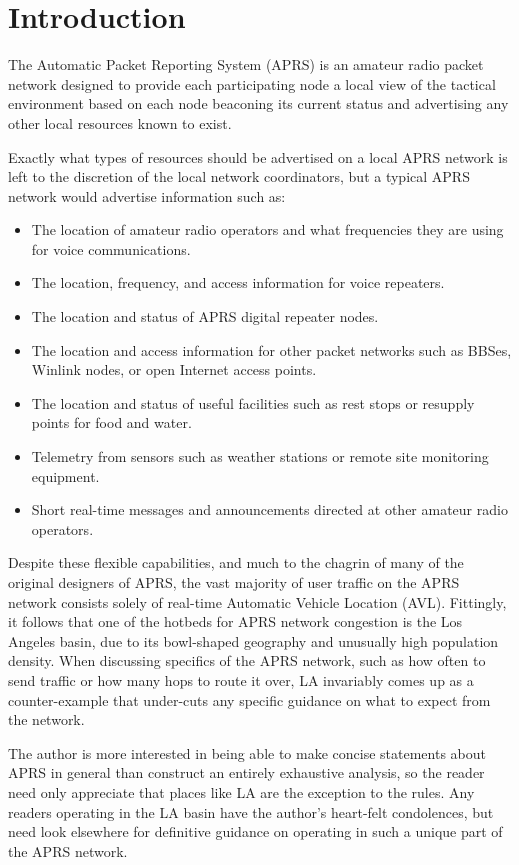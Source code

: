 

\chapter{Introduction}

The Automatic Packet Reporting System (APRS) is an amateur radio packet
network designed to provide each participating node a local view of the 
tactical environment based on each node beaconing its current status
and advertising any other local resources known to exist.

Exactly what types of resources should be advertised on a local APRS
network is left to the discretion of the local network coordinators, but
a typical APRS network would advertise information such as:
\begin{itemize}
\item The location of amateur radio operators and what frequencies they are using for voice communications.
\item The location, frequency, and access information for voice repeaters.
\item The location and status of APRS digital repeater nodes.
\item The location and access information for other packet networks such as BBSes, Winlink nodes, or open Internet access points.
\item The location and status of useful facilities such as rest stops or resupply points for food and water.
\item Telemetry from sensors such as weather stations or remote site monitoring equipment.
\item Short real-time messages and announcements directed at other amateur radio operators.
\end{itemize} 

Despite these flexible capabilities, 
and much to the chagrin of many of the original designers of APRS, 
the vast majority of user traffic on the APRS network consists solely of 
real-time Automatic Vehicle Location (AVL).
Fittingly, it follows that one of the hotbeds for APRS network congestion
is the Los Angeles basin, 
due to its bowl-shaped geography and unusually high population density. \cite{bobfixla}
When discussing specifics of the APRS network, such as how often to send traffic
or how many hops to route it over, LA invariably comes up as a counter-example
that under-cuts any specific guidance on what to expect from the network.

The author is more interested in being able to make concise statements about 
APRS in general than construct an entirely exhaustive analysis, 
so the reader need only appreciate that places like LA are the exception to the rules.
Any readers operating in the LA basin have the author's heart-felt condolences,
but need look elsewhere for definitive guidance on operating in such a unique
part of the APRS network.

